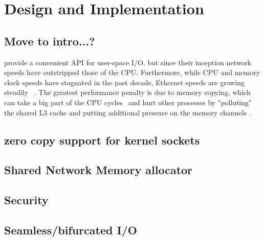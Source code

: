 \section{Design and Implementation}
\subsection{Move to intro...?}
\sockets provide a convenient API for user-space I/O, but since their inception network speeds have outstripped those of the CPU. Furthermore, while CPU and memory clock speeds have stagnated in the past decade, Ethernet speeds are growing steadily ~\cite{roadmap}. The greatest performance penalty is due to memory copying, which can take a big part of the CPU cycles~\cite{desendmsg} and hurt other processes by "polluting" the shared L3 cache and putting additional pressure on the memory channels \cite{markuze2016true}. 

\subsection{zero copy support for kernel sockets}
\subsection{Shared Network Memory allocator}
\subsection{Security}
\subsection{Seamless/bifurcated I/O}